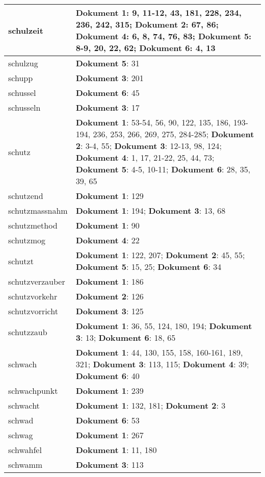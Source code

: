 \documentclass[a5paper]{article}
\begin{document}
\begin{longtable}[l]{|l|p{3in}|}
\hline
schulzeit & \textbf{Dokument 1}: 9, 11-12, 43, 181, 228, 234, 236, 242, 315; \textbf{Dokument 2}: 67, 86; \textbf{Dokument 4}: 6, 8, 74, 76, 83; \textbf{Dokument 5}: 8-9, 20, 22, 62; \textbf{Dokument 6}: 4, 13 \\
\hline
schulzug & \textbf{Dokument 5}: 31 \\
\hline
schupp & \textbf{Dokument 3}: 201 \\
\hline
schussel & \textbf{Dokument 6}: 45 \\
\hline
schusseln & \textbf{Dokument 3}: 17 \\
\hline
schutz & \textbf{Dokument 1}: 53-54, 56, 90, 122, 135, 186, 193-194, 236, 253, 266, 269, 275, 284-285; \textbf{Dokument 2}: 3-4, 55; \textbf{Dokument 3}: 12-13, 98, 124; \textbf{Dokument 4}: 1, 17, 21-22, 25, 44, 73; \textbf{Dokument 5}: 4-5, 10-11; \textbf{Dokument 6}: 28, 35, 39, 65 \\
\hline
schutzend & \textbf{Dokument 1}: 129 \\
\hline
schutzmassnahm & \textbf{Dokument 1}: 194; \textbf{Dokument 3}: 13, 68 \\
\hline
schutzmethod & \textbf{Dokument 1}: 90 \\
\hline
schutzmog & \textbf{Dokument 4}: 22 \\
\hline
schutzt & \textbf{Dokument 1}: 122, 207; \textbf{Dokument 2}: 45, 55; \textbf{Dokument 5}: 15, 25; \textbf{Dokument 6}: 34 \\
\hline
schutzverzauber & \textbf{Dokument 1}: 186 \\
\hline
schutzvorkehr & \textbf{Dokument 2}: 126 \\
\hline
schutzvorricht & \textbf{Dokument 3}: 125 \\
\hline
schutzzaub & \textbf{Dokument 1}: 36, 55, 124, 180, 194; \textbf{Dokument 3}: 13; \textbf{Dokument 6}: 18, 65 \\
\hline
schwach & \textbf{Dokument 1}: 44, 130, 155, 158, 160-161, 189, 321; \textbf{Dokument 3}: 113, 115; \textbf{Dokument 4}: 39; \textbf{Dokument 6}: 40 \\
\hline
schwachpunkt & \textbf{Dokument 1}: 239 \\
\hline
schwacht & \textbf{Dokument 1}: 132, 181; \textbf{Dokument 2}: 3 \\
\hline
schwad & \textbf{Dokument 6}: 53 \\
\hline
schwag & \textbf{Dokument 1}: 267 \\
\hline
schwahfel & \textbf{Dokument 1}: 11, 180 \\
\hline
schwamm & \textbf{Dokument 3}: 113 \\

\end{longtable}
\end{document}
